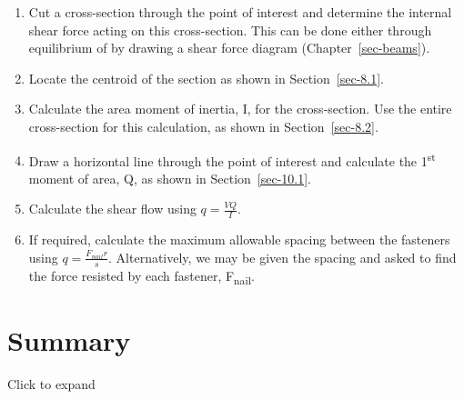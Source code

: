 \documentclass[
  letterpaper,
  DIV=11,
  numbers=noendperiod]{scrreprt}
\providecommand{\tightlist}{%
  \setlength{\itemsep}{0pt}\setlength{\parskip}{0pt}}\usepackage{longtable,booktabs,array}
\theoremstyle{definition}
\theoremstyle{remark}
\begin{document}
\begin{tcolorbox}[enhanced jigsaw, leftrule=.75mm, colbacktitle=quarto-callout-warning-color!10!white, breakable, opacityback=0, colback=white, titlerule=0mm, toprule=.15mm, colframe=quarto-callout-warning-color-frame, coltitle=black, title={Step-by-step: Shear flow}, toptitle=1mm, bottomrule=.15mm, rightrule=.15mm, left=2mm, arc=.35mm, opacitybacktitle=0.6, bottomtitle=1mm]

\begin{enumerate}
\def\labelenumi{\arabic{enumi}.}
\tightlist
\item
  Cut a cross-section through the point of interest and determine the
  internal shear force acting on this cross-section. This can be done
  either through equilibrium of by drawing a shear force diagram
  (Chapter~\ref{sec-beams}).
\item
  Locate the centroid of the section as shown in Section~\ref{sec-8.1}.
\item
  Calculate the area moment of inertia, I, for the cross-section. Use
  the entire cross-section for this calculation, as shown in
  Section~\ref{sec-8.2}.
\item
  Draw a horizontal line through the point of interest and calculate the
  1\textsuperscript{st} moment of area, Q, as shown in
  Section~\ref{sec-10.1}.
\item
  Calculate the shear flow using \(q=\frac{V Q}{I}\).
\item
  If required, calculate the maximum allowable spacing between the
  fasteners using \(q=\frac{F_{nail} r}{s}\). Alternatively, we may be
  given the spacing and asked to find the force resisted by each
  fastener, F\textsubscript{nail}.
\end{enumerate}

\end{tcolorbox}

\section*{Summary}\label{summary-9}


Click to expand
\end{document}
